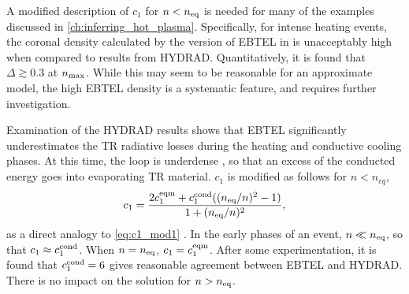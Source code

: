 A modified description of $c_1$ for $n < n_\textup{eq}$ is needed for many of the examples discussed in \autoref{ch:inferring_hot_plasma}. Specifically, for intense heating events, the coronal density calculated by the version of EBTEL in \citet{cargill_enthalpy-based_2012} is unacceptably high when compared to results from HYDRAD. Quantitatively, it is found that $\Delta\gtrsim0.3$ at $n_\textup{max}$. While this may seem to be reasonable for an approximate model, the high EBTEL density is a systematic feature, and requires further investigation.

Examination of the HYDRAD results shows that EBTEL significantly underestimates the TR radiative losses during the heating and conductive cooling phases. At this time, the loop is underdense \citep[e.g.][]{cargill_nanoflare_2004}, so that an excess of the conducted energy goes into evaporating TR material. $c_1$ is modified as follows for $n < n_{eq}$,
\begin{equation}\label{eq:c1_mod}
    c_1 = \frac{2c_1^\textup{eqm} + c_1^\textup{cond}((n_\textup{eq}/n)^2-1)}{1+(n_\textup{eq}/n)^2},
\end{equation}
as a direct analogy to \autoref{eq:c1_mod1} \citep[Equation 18 of][]{cargill_enthalpy-based_2012}. In the early phases of an event, $n \ll n_\textup{eq}$, so that $c_1 \approx c_1^\textup{cond}$. When $n = n_\textup{eq}$, $c_1 = c_1^\textup{eqm}$. After some experimentation, it is found that $c_1^\textup{cond} = 6$  gives reasonable agreement between EBTEL and HYDRAD. There is no impact on the solution for $n > n_\textup{eq}$.

